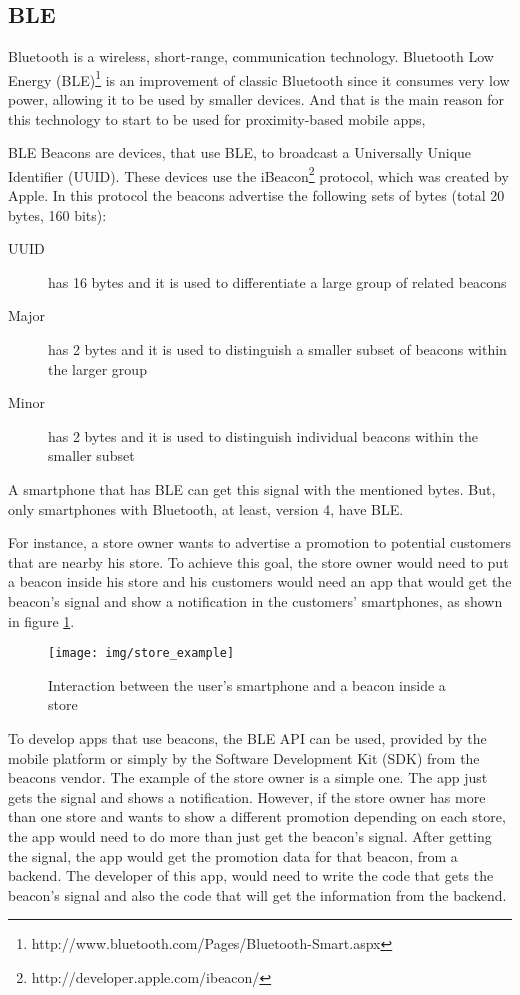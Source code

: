 \subsection{BLE}
\label{sub:bluetooth_low_energy}
Bluetooth is a wireless, short-range, communication technology.
Bluetooth Low Energy (BLE)\footnote{http://www.bluetooth.com/Pages/Bluetooth-Smart.aspx} 
is an improvement of classic Bluetooth since it consumes 
very low power, allowing it to be used by smaller devices.
And that is the main reason for this technology to start to 
be used for proximity-based mobile apps,

BLE Beacons are devices, that use BLE, to broadcast a 
Universally Unique Identifier (UUID). 
These devices use the 
iBeacon\footnote{http://developer.apple.com/ibeacon/} 
protocol, which was created
by Apple\texttrademark. In this protocol the beacons
advertise the following sets of bytes
(total 20 bytes, 160 bits):
\begin{description}
  \item[UUID] has 16 bytes and it is used to differentiate a 
  large group of related beacons
  \item[Major] has 2 bytes and it is used to distinguish a smaller 
  subset of beacons within the larger group
  \item[Minor] has 2 bytes and it is used to distinguish individual
  beacons within the smaller subset
\end{description}
A smartphone that
has BLE can get this signal with the mentioned bytes.
But, only smartphones
with Bluetooth, at least, version 4, have BLE.

For instance, a store owner wants to advertise a promotion
to potential customers that are nearby his store. To 
achieve this goal, the store owner would need to put
a beacon inside his store and his customers would need an
app that would get the beacon's signal and show a 
notification in the customers' smartphones,
as shown in figure \ref{fig:store_example}.
\begin{figure}[!ht]
  \centering
    \texttt{[image: img/store\_example]}
    \caption{Interaction between the user's smartphone
    and a beacon inside a store}
    \label{fig:store_example}
\end{figure}

To develop apps that use beacons, the 
BLE API can be used, provided by the 
mobile platform or simply by the Software
Development Kit (SDK) from the 
beacons vendor. The example of the store owner is a
simple one. The app just gets the signal and shows a 
notification. However, if the store owner has more than
one store and wants to show a different promotion depending
on each store, the app would need to do more than just get
the beacon's signal. After getting the signal, the app
would get the promotion data for that beacon, from a 
backend. The developer of this app, would need to
write the code that gets the beacon's signal and also
the code that will get the information from the backend.

